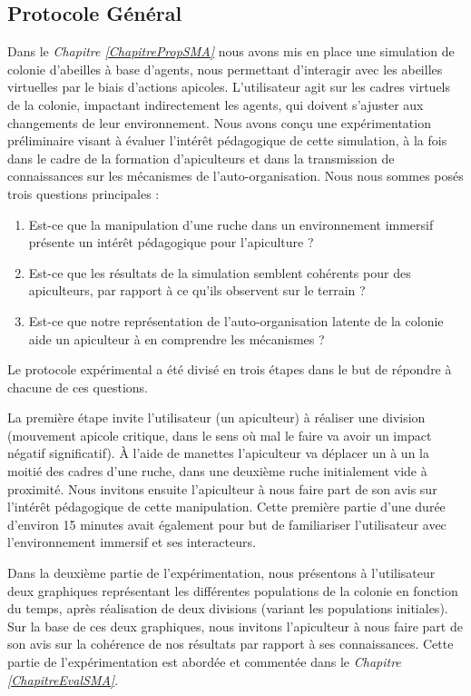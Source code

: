 		\subsection{Protocole Général}
		\label{protocoleGeneral}
		Dans le \textit{Chapitre \ref{ChapitrePropSMA}} nous avons mis en place une simulation de colonie d'abeilles à base d'agents, nous permettant d'interagir avec les abeilles virtuelles par le biais d'actions apicoles. L'utilisateur agit sur les cadres virtuels de la colonie, impactant indirectement les agents, qui doivent s'ajuster aux changements de leur environnement. Nous avons conçu une expérimentation préliminaire visant à évaluer l'intérêt pédagogique de cette simulation, à la fois dans le cadre de la formation d'apiculteurs et dans la transmission de connaissances sur les mécanismes de l'auto-organisation. Nous nous sommes posés trois questions principales :
		\begin{enumerate}
			\item Est-ce que la manipulation d'une ruche dans un environnement immersif présente un intérêt pédagogique pour l'apiculture ?
			\item Est-ce que les résultats de la simulation semblent cohérents pour des apiculteurs, par rapport à ce qu'ils observent sur le terrain ?
			\item Est-ce que notre représentation de l'auto-organisation latente de la colonie aide un apiculteur à en comprendre les mécanismes ?
		\end{enumerate}

    Le protocole expérimental a été divisé en trois étapes dans le but de répondre à chacune de ces questions.
    
    La première étape invite l'utilisateur (un apiculteur) à réaliser une division (mouvement apicole critique, dans le sens où mal le faire va avoir un impact négatif significatif). À l'aide de manettes l'apiculteur va déplacer un à un la moitié des cadres d'une ruche, dans une deuxième ruche initialement vide à proximité. Nous invitons ensuite l'apiculteur à nous faire part de son avis sur l'intérêt pédagogique de cette manipulation. Cette première partie d'une durée d'environ 15 minutes avait également pour but de familiariser l'utilisateur avec l'environnement immersif et ses interacteurs.
    
    Dans la deuxième partie de l'expérimentation, nous présentons à l'utilisateur deux graphiques représentant les différentes populations de la colonie en fonction du temps, après réalisation de deux divisions (variant les populations initiales). Sur la base de ces deux graphiques, nous invitons l'apiculteur à nous faire part de son avis sur la cohérence de nos résultats par rapport à ses connaissances. Cette partie de l'expérimentation est abordée et commentée dans le \textit{Chapitre \ref{ChapitreEvalSMA}}.
    
